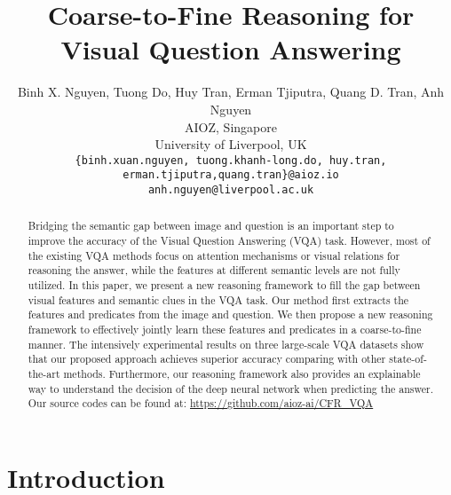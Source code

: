 \documentclass[10pt,twocolumn,letterpaper]{article}
\begin{document}
\title{Coarse-to-Fine Reasoning for Visual Question Answering}
\author{Binh X. Nguyen, Tuong Do, Huy Tran, Erman Tjiputra, Quang D. Tran, Anh Nguyen\\
{AIOZ, Singapore}\\
{University of Liverpool, UK}\\
{\tt\small \{binh.xuan.nguyen, tuong.khanh-long.do, huy.tran, erman.tjiputra,quang.tran\}@aioz.io}\\
{\tt\small anh.nguyen@liverpool.ac.uk}}

\maketitle

\begin{abstract}
Bridging the semantic gap between image and question is an important step to improve the accuracy of the Visual Question Answering (VQA) task. However, most of the existing VQA methods focus on attention mechanisms or visual relations for reasoning the answer, while the features at different semantic levels are not fully utilized. In this paper, we present a new reasoning framework to fill the gap between visual features and semantic clues in the VQA task. Our method first extracts the features and predicates from the image and question. We then propose a new reasoning framework to effectively jointly learn these features and predicates in a coarse-to-fine manner. The intensively experimental results on three large-scale VQA datasets show that our proposed approach achieves superior accuracy comparing with other state-of-the-art methods. Furthermore, our reasoning framework also provides an explainable way to understand the decision of the deep neural network when predicting the answer. Our source codes can be found at: \url{https://github.com/aioz-ai/CFR_VQA}



\end{abstract}

\section{Introduction}
\label{sec:intro}
\end{document}
